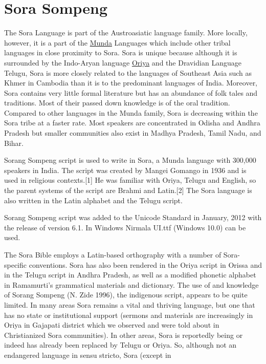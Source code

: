 \section{Sora Sompeng}
\label{s:sorasompeng}
The Sora Language is part of the Austroasiatic language family. More locally, however, it is a part of the \hyperref[s:munda]{Munda} Languages which include other tribal languages in close proximity to Sora. Sora is unique because although it is surrounded by the Indo-Aryan language \hyperref[s:oriya]{Oriya} and the Dravidian Language Telugu, Sora is more closely related to the languages of Southeast Asia such as Khmer in Cambodia than it is to the predominant languages of India. Moreover, Sora contains very little formal literature but has an abundance of folk tales and traditions. Most of their passed down knowledge is of the oral tradition. Compared to other languages in the Munda family, Sora is decreasing within the Sora tribe at a faster rate. Most speakers are concentrated in Odisha and Andhra Pradesh but smaller communities also exist in Madhya Pradesh, Tamil Nadu, and Bihar.

Sorang Sompeng script is used to write in Sora, a Munda language with 300,000 speakers in India. The script was created by Mangei Gomango in 1936 and is used in religious contexts.[1] He was familiar with Oriya, Telugu and English, so the parent systems of the script are Brahmi and Latin.[2]
The Sora language is also written in the Latin alphabet and the Telugu script.

Sorang Sompeng script was added to the Unicode Standard in January, 2012 with the release of version 6.1. In Windows Nirmala UI.ttf (Windows 10.0) can be used. 

\newfontfamily{}


 	

The Sora Bible employs a Latin-based orthography with a number of Sora-specific
conventions. Sora has also been rendered in the Oriya script in Orissa and in
the Telugu script in Andhra Pradesh, as well as a modified phonetic alphabet in
Ramamurti’s grammatical materials and dictionary. The use of and knowledge of
Sorang Sompeng (N. Zide 1996), the indigenous script, appears to be quite limited.
In many areas Sora remains a vital and thriving language, but one that has no state
or institutional support (sermons and materials are increasingly in Oriya in Gajapati
district which we observed and were told about in Christianized Sora communities).
In other areas, Sora is reportedly being or indeed has already been replaced by Telugu
or Oriya. So, although not an endangered language in sensu stricto, Sora (except in


